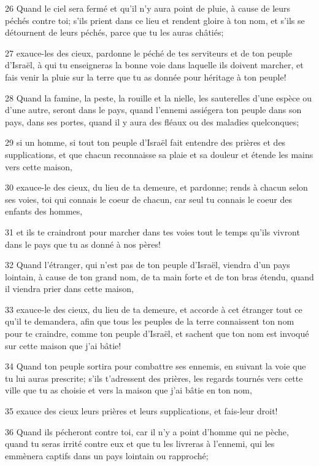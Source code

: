 \par 26 Quand le ciel sera fermé et qu'il n'y aura point de pluie, à cause de leurs péchés contre toi; s'ils prient dans ce lieu et rendent gloire à ton nom, et s'ils se détournent de leurs péchés, parce que tu les auras châtiés;
\par 27 exauce-les des cieux, pardonne le péché de tes serviteurs et de ton peuple d'Israël, à qui tu enseigneras la bonne voie dans laquelle ils doivent marcher, et fais venir la pluie sur la terre que tu as donnée pour héritage à ton peuple!
\par 28 Quand la famine, la peste, la rouille et la nielle, les sauterelles d'une espèce ou d'une autre, seront dans le pays, quand l'ennemi assiégera ton peuple dans son pays, dans ses portes, quand il y aura des fléaux ou des maladies quelconques;
\par 29 si un homme, si tout ton peuple d'Israël fait entendre des prières et des supplications, et que chacun reconnaisse sa plaie et sa douleur et étende les mains vers cette maison,
\par 30 exauce-le des cieux, du lieu de ta demeure, et pardonne; rends à chacun selon ses voies, toi qui connais le coeur de chacun, car seul tu connais le coeur des enfants des hommes,
\par 31 et ils te craindront pour marcher dans tes voies tout le temps qu'ils vivront dans le pays que tu as donné à nos pères!
\par 32 Quand l'étranger, qui n'est pas de ton peuple d'Israël, viendra d'un pays lointain, à cause de ton grand nom, de ta main forte et de ton bras étendu, quand il viendra prier dans cette maison,
\par 33 exauce-le des cieux, du lieu de ta demeure, et accorde à cet étranger tout ce qu'il te demandera, afin que tous les peuples de la terre connaissent ton nom pour te craindre, comme ton peuple d'Israël, et sachent que ton nom est invoqué sur cette maison que j'ai bâtie!
\par 34 Quand ton peuple sortira pour combattre ses ennemis, en suivant la voie que tu lui auras prescrite; s'ils t'adressent des prières, les regards tournés vers cette ville que tu as choisie et vers la maison que j'ai bâtie en ton nom,
\par 35 exauce des cieux leurs prières et leurs supplications, et fais-leur droit!
\par 36 Quand ils pécheront contre toi, car il n'y a point d'homme qui ne pèche, quand tu seras irrité contre eux et que tu les livreras à l'ennemi, qui les emmènera captifs dans un pays lointain ou rapproché;
